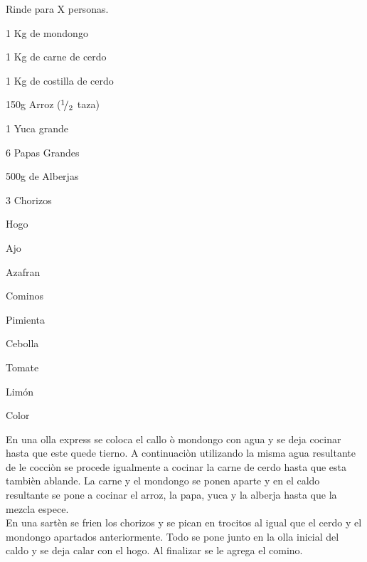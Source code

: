 
Rinde para X personas.

\begin{ingredientes}
\item 1 Kg de mondongo
\item 1 Kg de carne de cerdo
\item 1 Kg de costilla de cerdo
\item 150g Arroz (${}^{1}\!/_{2}$ taza)
\item 1 Yuca grande
\item 6 Papas Grandes
\item 500g de Alberjas
\item 3 Chorizos
\item Hogo
\item Ajo
\item Azafran
\item Cominos
\item Pimienta
\item Cebolla
\item Tomate
\item Limón
\item Color
\item 
\end{ingredientes}
\preparacion
En una olla express se coloca el callo ò mondongo con agua y se deja cocinar hasta que este quede tierno. A continuaciòn utilizando la misma agua resultante de le cocciòn se procede igualmente a cocinar la carne de cerdo hasta que esta tambièn ablande. La carne y el mondongo se ponen aparte y en el caldo resultante se pone a cocinar el arroz, la papa, yuca y la alberja hasta que la mezcla espece.\\

En una sartèn se frien los chorizos y se pican en trocitos al igual que el cerdo y el mondongo apartados anteriormente. Todo se pone junto en la olla inicial del caldo y se deja calar con el hogo. Al finalizar se le agrega el comino.